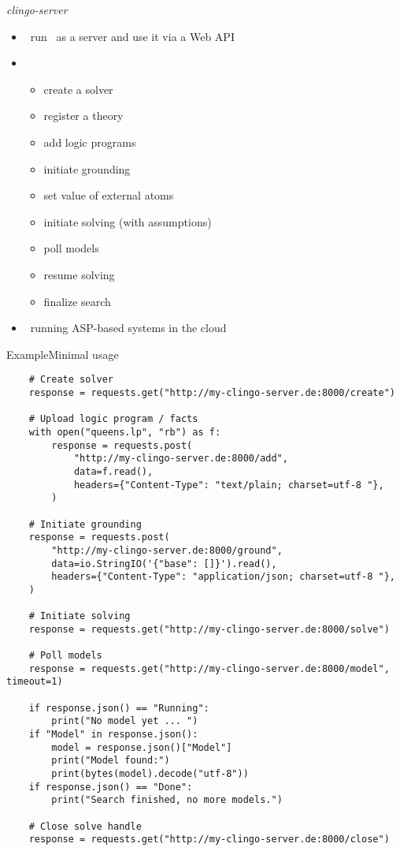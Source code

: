 \begin{frame}{\textit{clingo-server}}
  \begin{itemize}
    \item {} \ run \clingo\ as a server and use it via a Web API
    \item {} \
      \begin{itemize}
        \item create a solver
        \item register a theory
        \item add logic programs
        \item initiate grounding
        \item set value of external atoms
        \item initiate solving (with assumptions)
        \item poll models
        \item resume solving
        \item finalize search
      \end{itemize}
    \item {} \ running ASP-based systems in the cloud
  \end{itemize}
\end{frame}
\begin{frame}[fragile,shrink]{Example}{Minimal usage}
  \begin{lstlisting}
    # Create solver
    response = requests.get("http://my-clingo-server.de:8000/create")

    # Upload logic program / facts
    with open("queens.lp", "rb") as f:
        response = requests.post(
            "http://my-clingo-server.de:8000/add",
            data=f.read(),
            headers={"Content-Type": "text/plain; charset=utf-8 "},
        )

    # Initiate grounding
    response = requests.post(
        "http://my-clingo-server.de:8000/ground",
        data=io.StringIO('{"base": []}').read(),
        headers={"Content-Type": "application/json; charset=utf-8 "},
    )

    # Initiate solving
    response = requests.get("http://my-clingo-server.de:8000/solve")

    # Poll models
    response = requests.get("http://my-clingo-server.de:8000/model", timeout=1)

    if response.json() == "Running":
        print("No model yet ... ")
    if "Model" in response.json():
        model = response.json()["Model"]
        print("Model found:")
        print(bytes(model).decode("utf-8"))
    if response.json() == "Done":
        print("Search finished, no more models.")

    # Close solve handle
    response = requests.get("http://my-clingo-server.de:8000/close")
  \end{lstlisting}
\end{frame}

%
